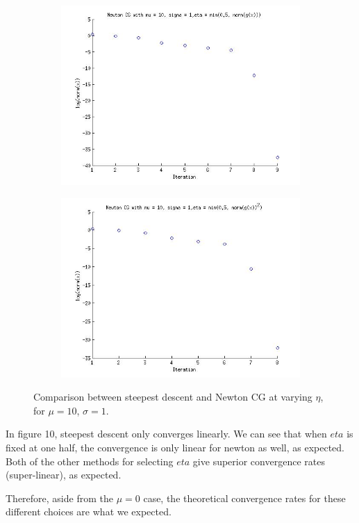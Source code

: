 \documentclass{article}
\begin{document}
\begin{figure}[!htb]
\begin{subfigure}[bh]{0.45\textwidth}
        \end{subfigure}
        \centering
        \begin{subfigure}[bh]{0.45\textwidth}
                \includegraphics[width=\textwidth]{figs/P3NCGmu10sig1eta2.jpg}
        \end{subfigure}%
        \begin{subfigure}[bh]{0.45\textwidth}
                \includegraphics[width=\textwidth]{figs/P3NCGmu10sig1eta3.jpg}
        \end{subfigure}
        \caption{Comparison between steepest descent and Newton CG at
 varying $\eta$, for $\mu=10$, $\sigma=1$.}
\end{figure}
In figure 10, steepest descent only converges linearly. We can see that
when $eta$ is fixed at one half, the convergence is only linear for
newton as well, as expected. Both of the other methods for selecting
$eta$ give superior convergence rates (super-linear), as expected. 

Therefore, aside from the $\mu=0$ case, the theoretical convergence
rates for these different choices are what we expected. 
\end{document}
